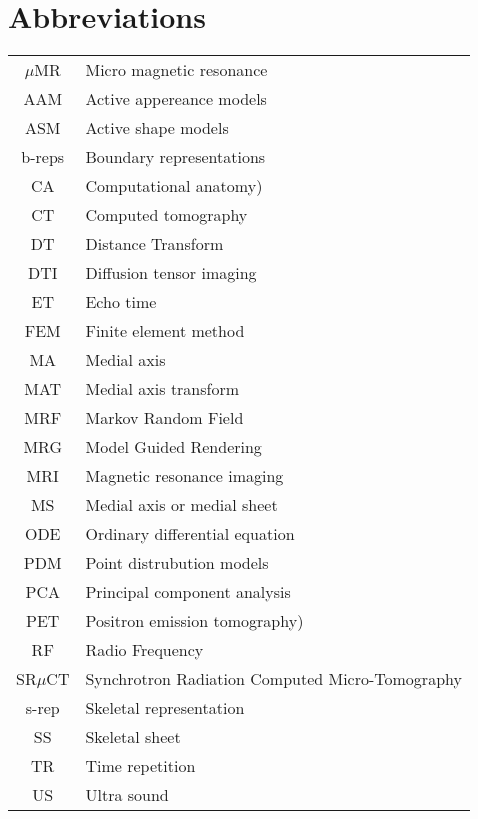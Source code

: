 

\chapter*{Abbreviations}

\begin{center}
\begin{tabular}{cp{12cm}}

$\mu$MR & Micro magnetic resonance \\
AAM & Active appereance models \\
ASM & Active shape models \\
b-reps & Boundary representations \\
CA  & Computational anatomy) \\
CT & Computed tomography \\
DT & Distance Transform \\
DTI & Diffusion tensor imaging \\
ET & Echo time \\
FEM & Finite element method \\
MA  & Medial axis \\
MAT & Medial axis transform \\
MRF & Markov Random Field \\
MRG & Model Guided Rendering \\
MRI & Magnetic resonance imaging \\
MS  & Medial axis or medial sheet\\
ODE & Ordinary differential equation \\
PDM & Point distrubution models \\
PCA & Principal component analysis\\
PET & Positron emission tomography)\\
RF  & Radio Frequency \\
SR$\mu$CT &  Synchrotron Radiation Computed Micro-Tomography \\
s-rep & Skeletal representation \\
SS  & Skeletal sheet \\
TR & Time repetition \\
US & Ultra sound \\ 

\end{tabular}
\end{center}

